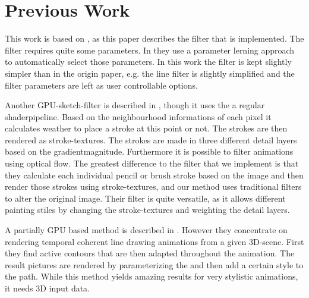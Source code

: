 \section{Previous Work}
This work is based on \cite{mainPaper}, as this paper describes the filter that
is implemented. The filter requires quite some parameters. In \cite{mainPaper}
they use a parameter lerning approach to automatically select those parameters.
In this work the filter is kept slightly simpler than in the origin paper, e.g.
the line filter is slightly simplified and the filter parameters are left as
user controllable options. 

Another GPU-sketch-filter is described in \cite{Lu:2010:IPS}, though it uses the
a regular shaderpipeline. Based on the neighbourhood informations of each pixel
it calculates weather to place a stroke at this point or not. The strokes are
then rendered as stroke-textures. The strokes are made in three different detail
layers based on the gradientmagnitude. Furthermore it is possible to filter
animations using optical flow. The greatest difference to the filter that we
implement is that they calculate each individual pencil or brush stroke based on
the image and then render those strokes using stroke-textures, and our method
uses traditional filters to alter the original image. Their filter is quite
versatile, as it allows different painting stiles by changing the
stroke-textures and weighting the detail layers.


A partially GPU based method is described in \cite{Benard:2012:ASC}. However
they concentrate on rendering temporal coherent line drawing animations from a
given 3D-scene. First they find active contours that are then adapted throughout
the animation. The result pictures are rendered by parameterizing the and then
add a certain style to the path. While this method yields amazing results for
very stylistic animations, it needs 3D input data.
